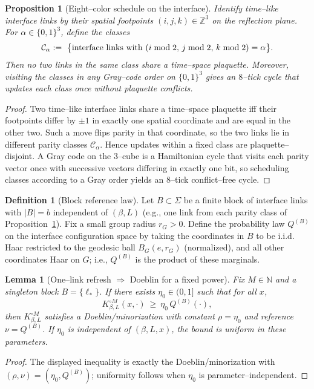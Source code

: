 \documentclass[11pt]{amsart}
\theoremstyle{plain}
\newtheorem{lemma}[theorem]{Lemma}
\newtheorem{proposition}[theorem]{Proposition}
\theoremstyle{definition}
\newtheorem{definition}[theorem]{Definition}
\theoremstyle{remark}
\begin{document}
\begin{proposition}[Eight--color schedule on the interface]\label{prop:eight-color-schedule}
Identify time--like interface links by their spatial footpoints $(i,j,k)\in\mathbb Z^3$ on the reflection plane. For $\alpha\in\{0,1\}^3$, define the classes
\[
  \mathcal C_{\alpha}
   \\ :=\ \big\{\text{interface links with }(i\bmod 2,\,j\bmod 2,\,k\bmod 2)=\alpha\big\}.
\]
Then no two links in the same class share a time--space plaquette. Moreover, visiting the classes in any Gray--code order on $\{0,1\}^3$ gives an $8$--tick cycle that updates each class once without plaquette conflicts.
\end{proposition}
\begin{proof}
Two time--like interface links share a time--space plaquette iff their footpoints differ by $\pm1$ in exactly one spatial coordinate and are equal in the other two. Such a move flips parity in that coordinate, so the two links lie in different parity classes $\mathcal C_{\alpha}$. Hence updates within a fixed class are plaquette--disjoint. A Gray code on the $3$--cube is a Hamiltonian cycle that visits each parity vector once with successive vectors differing in exactly one bit, so scheduling classes according to a Gray order yields an $8$--tick conflict--free cycle.
\end{proof}

\begin{definition}[Block reference law]\label{def:block-reference}
Let $B\subset \Sigma$ be a finite block of interface links with $|B|=b$ independent of $(\beta,L)$ (e.g., one link from each parity class of Proposition~\ref{prop:eight-color-schedule}). Fix a small group radius $r_G>0$. Define the probability law $Q^{(B)}$ on the interface configuration space by taking the coordinates in $B$ to be i.i.d. Haar restricted to the geodesic ball $B_G(e,r_G)$ (normalized), and all other coordinates Haar on $G$; i.e., $Q^{(B)}$ is the product of these marginals.
\end{definition}

\begin{lemma}[One--link refresh $\Rightarrow$ Doeblin for a fixed power]\label{lem:one-link-doeblin}
Fix $M\in\mathbb N$ and a singleton block $B=\{\ell_*\}$. If there exists $\eta_0\in(0,1]$ such that for all $x$,
\[
  K_{\beta,L}^{\circ M}(x,\cdot)\ \ge\ \eta_0\, Q^{(B)}(\cdot),
\]
then $K_{\beta,L}^{\circ M}$ satisfies a Doeblin/minorization with constant $\rho=\eta_0$ and reference $\nu=Q^{(B)}$. If $\eta_0$ is independent of $(\beta,L,x)$, the bound is uniform in these parameters.
\end{lemma}
\begin{proof}
The displayed inequality is exactly the Doeblin/minorization with $(\rho,\nu)=(\eta_0, Q^{(B)})$; uniformity follows when $\eta_0$ is parameter--independent.
\end{proof}
\end{document}
